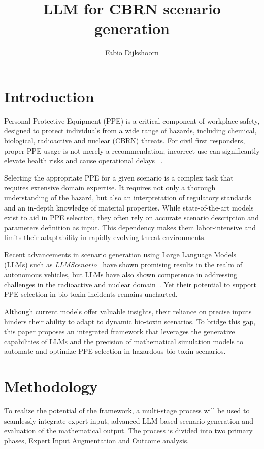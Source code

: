 \documentclass[stu]{apa7}
\begin{document}
\title{LLM for CBRN scenario generation}
\author{Fabio Dijkshoorn}
\maketitle
\section{Introduction}\label{sec:introduction}
Personal Protective Equipment (PPE) is a critical component of workplace safety,
designed to protect individuals from a wide range of hazards, including chemical,
biological, radioactive and nuclear (CBRN) threats.
For civil first responders, proper PPE usage is not merely a recommendation; incorrect
use can significantly elevate health risks and cause operational delays ~\cite{world2020personal}.

Selecting the appropriate PPE for a given scenario is a complex task that requires
extensive domain expertise.
It requires not only a thorough understanding of the hazard, but also an interpretation
of regulatory standards and an in-depth knowledge of material properties.
While state-of-the-art models exist to aid in PPE selection, they often rely on
accurate scenario description and parameters definition as input.
This dependency makes them labor-intensive and limits their adaptability in rapidly
evolving threat environments.

Recent advancements in scenario generation using Large Language Models (LLMs) such as
\textit{LLMScenario}~\cite{chang_llmscenario_2024} have shown promising results in the
realm of autonomous vehicles, but LLMs have also shown competence in addressing challenges
in the radioactive and nuclear domain~\cite{iob_nuclear_2024}.
Yet their potential to support PPE selection in bio-toxin incidents remains uncharted.

Although current models offer valuable insights, their reliance on precise inputs
hinders their ability to adapt to dynamic bio-toxin scenarios.
To bridge this gap, this paper proposes an integrated framework that leverages the
generative capabilities of LLMs and the precision of mathematical simulation models to automate and
optimize PPE selection in hazardous bio-toxin scenarios.

\section{Methodology}\label{sec:methodology}
To realize the potential of the framework, a multi-stage process will be used to
seamlessly integrate expert input, advanced LLM-based scenario generation and
evaluation of the mathematical output.
The process is divided into two primary phases, Expert Input Augmentation and Outcome
analysis.
\end{document}
